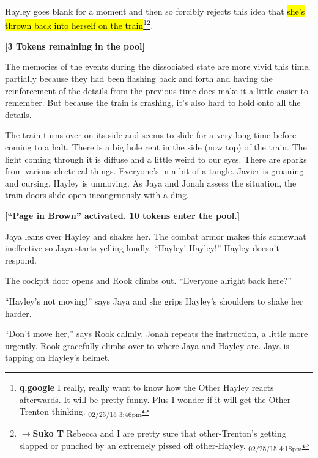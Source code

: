 Hayley goes blank for a moment and then so forcibly rejects this idea that \hl{she's thrown back into herself on the train}\footnote{\textbf{q.google }I really, really want to know how the Other Hayley reacts afterwards.  It will be pretty funny.  Plus I wonder if it will get the Other Trenton thinking. \textsubscript{02/25/15 3:46pm}}\footnote{$\rightarrow$\textbf{Suko T }Rebecca and I are pretty sure that other-Trenton's getting slapped or punched by an extremely pissed off other-Hayley. \textsubscript{02/25/15 4:18pm}}.



\textbf{{[}3 Tokens remaining in the pool{]}}



The memories of the events during the dissociated state are more vivid this time, partially because they had been flashing back and forth and having the reinforcement of the details from the previous time does make it a little easier to remember.  But because the train is crashing, it's also hard to hold onto all the details.



The train turns over on its side and seems to slide for a very long time before coming to a halt.  There is a big hole rent in the side (now top) of the train.  The light coming through it is diffuse and a little weird to our eyes.  There are sparks from various electrical things.  Everyone's in a bit of a tangle.  Javier is groaning and cursing.  Hayley is unmoving.  As Jaya and Jonah assess the situation, the train doors slide open incongruously with a ding.



\textbf{{[}``Page in Brown'' activated.  10 tokens enter the pool.{]}}



Jaya leans over Hayley and shakes her.  The combat armor makes this somewhat ineffective so Jaya starts yelling loudly, ``Hayley!  Hayley!''  Hayley doesn't respond.



The cockpit door opens and Rook climbs out.  ``Everyone alright back here?''

``Hayley's not moving!'' says Jaya and she grips Hayley's shoulders to shake her harder.

``Don't move her,'' says Rook calmly.  Jonah repeats the instruction, a little more urgently.  Rook gracefully climbs over to where Jaya and Hayley are.  Jaya is tapping on Hayley's helmet.



